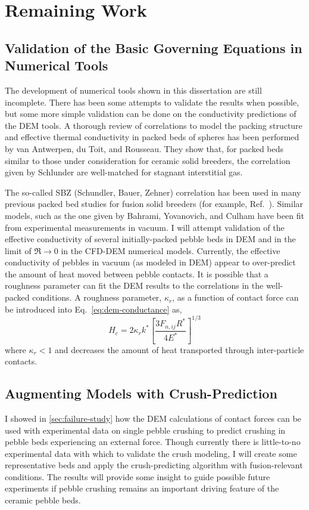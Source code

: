 \section{Remaining Work}
\subsection{Validation of the Basic Governing Equations in Numerical Tools}

The development of numerical tools shown in this dissertation are still incomplete. There has been some attempts to validate the results when possible, but some more simple validation can be done on the conductivity predictions of the DEM tools. A thorough review of correlations to model the packing structure and effective thermal conductivity in packed beds of spheres has been performed by van Antwerpen, du Toit, and Rousseau.\cite{VanAntwerpen2010} They show that, for packed beds similar to those under consideration for ceramic solid breeders, the correlation given by Schlunder\etal\cite{bauer1978effective,Zehner1972} are well-matched for stagnant interstitial gas. 

The so-called SBZ (Schundler, Bauer, Zehner) correlation has been used in many previous packed bed studies for fusion solid breeders (for example, Ref.~\cite{Abou-Sena:2007ff}). Similar models, such as the one given by Bahrami, Yovanovich, and Culham have been fit from experimental measurements in vacuum.\cite{Bahrami20063691} I will attempt validation of the effective conductivity of several initially-packed pebble beds in DEM and in the limit of $\Re \rightarrow 0$ in the CFD-DEM numerical models. Currently, the effective conductivity of pebbles in vacuum (as modeled in DEM) appear to over-predict the amount of heat moved between pebble contacts. It is possible that a roughness parameter can fit the DEM results to the correlations in the well-packed conditions. A roughness parameter, $\kappa_r$, as a function of contact force can be introduced into Eq.~\ref{eq:dem-conductance} as,
\begin{equation}
	H_c = 2\kappa_rk^*\left[\frac{3F_{n,ij}R^*}{4E^*}\right]^{1/3}
\end{equation}
where $\kappa_r < 1$ and decreases the amount of heat transported through inter-particle contacts.

\subsection{Augmenting Models with Crush-Prediction}
I showed in \cref{sec:failure-study} how the DEM calculations of contact forces can be used with experimental data on single pebble crushing to predict crushing in pebble beds experiencing an external force. Though currently there is little-to-no experimental data with which to validate the crush modeling, I will create some representative beds and apply the crush-predicting algorithm with fusion-relevant conditions. The results will provide some insight to guide possible future experiments if pebble crushing remains an important driving feature of the ceramic pebble beds.

